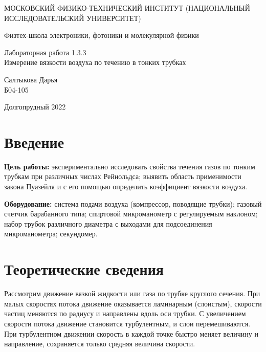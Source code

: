 \documentclass[a4paper,12pt]{article} %
\begin{document}
	
	\begin{titlepage}
	\begin{center}
		{\large МОСКОВСКИЙ ФИЗИКО-ТЕХНИЧЕСКИЙ ИНСТИТУТ (НАЦИОНАЛЬНЫЙ ИССЛЕДОВАТЕЛЬСКИЙ УНИВЕРСИТЕТ)}
	\end{center}
	\begin{center}
		{\large Физтех-школа электроники, фотоники и молекулярной физики}
	\end{center}
	
	
	\vspace{4.5cm}
	{\huge
		\begin{center}
			{Лабораторная работа 1.3.3}\\
			Измерение вязкости воздуха по течению в тонких трубках
		\end{center}
	}
	\vspace{2cm}
	\begin{flushright}
		{\LARGE Салтыкова Дарья \\
			\vspace{0.5cm}
			Б04-105}
	\end{flushright}
	\vspace{8cm}
	\begin{center}
		Долгопрудный 2022
	\end{center}
\end{titlepage}

\section{Введение}

\textbf{Цель работы:} экспериментально исследовать свойства течения газов по тонким трубкам при различных числах Рейнольдса; выявить область применимости закона Пуазейля и с его помощью определить коэффициент вязкости воздуха.
\medskip

\noindent \textbf{Оборудование:} система подачи воздуха (компрессор, поводящие трубки); газовый счетчик барабанного типа; спиртовой микроманометр с регулируемым наклоном; набор трубок различного диаметра с выходами для подсоединения микроманометра; секундомер.
\medskip

\section{Теоретические сведения}

\noindent Рассмотрим движение вязкой жидкости или газа по трубке круглого сечения. При малых скоростях потока движение оказывается ламинарным (слоистым), скорости частиц меняются по радиусу и направлены вдоль оси трубки. С увеличением скорости потока движение становится турбулентным, и слои перемешиваются. При турбулентном движении скорость в каждой точке быстро меняет величину и направление, сохраняется только средняя величина скорости.
\end{document}
